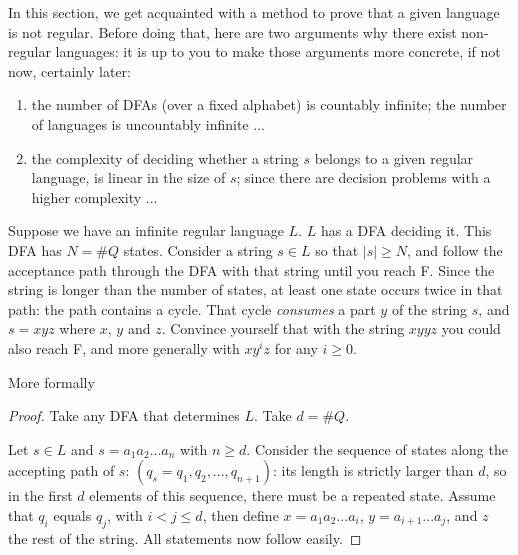 In this section, we get acquainted with a method to prove that a given
language is not regular. Before doing that, here are two arguments why
there exist non-regular languages: it is up to you to make those
arguments more concrete, if not now, certainly later:
\begin{enumerate}

\item
the number of DFAs (over a fixed alphabet) is countably infinite; the
number of languages is uncountably infinite ...

\item
the complexity of deciding whether a string $s$ belongs to a given
regular language, is linear in the size of $s$; since there are
decision problems with a higher complexity ...

\end{enumerate}


Suppose we have an infinite regular language $L$. $L$ has a DFA
deciding it. This DFA has $N = \#Q$ states. Consider a string $s \in
L$ so that $|s| \geq N$, and follow the acceptance path through the DFA
with that string until you reach F. Since the string is longer than
the number of states, at least one state occurs twice in that path:
the path contains a cycle. That cycle {\em consumes} a part $y$ of the
string $s$, and $s = xyz$ where $x$, $y$ and $z$. Convince yourself
that with the string $xyyz$ you could also reach F, and more generally
with $xy^iz$ for any $i \geq 0$.

More formally


\begin{proof}
Take any DFA that determines $L$. Take $d = \#Q$.

Let $s \in L$ and $s = a_1a_2...a_n$ with $n \geq d$.
Consider the sequence of states along the accepting path of $s$:
$(q_s=q_1,q_2,...,q_{n+1})$: its length is strictly larger than $d$,
so in the first $d$ elements of this sequence, there must be a
repeated state. Assume that $q_i$ equals $q_j$, with $i < j \leq d$,
then define $x = a_1a_2...a_{i}$, $y = a_{i+1}...a_j$, and $z$ the
rest of the string. All statements now follow easily.
\end{proof}

